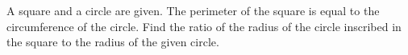 A square and a circle are given. The perimeter of the square is equal to the circumference of the circle. Find the ratio of the radius of the circle inscribed in the square to the radius of the given circle.
